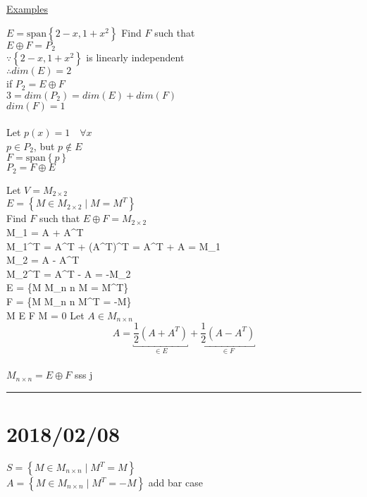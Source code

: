 \documentclass[12pt]{article}
\newcommand{\uu}[1]{\underbracket{#1}}
\newcommand{\todo}[0]{\text{\textcolor{red}{\textbackslash\textbackslash TODO \ }}}
\newenvironment{examples}{\shownto{-,compact}\underline{Examples}\enumerate}{\endenumerate\divider\endshownto}
\newcommand{\bb}[1]{\left\{#1\right\}}
\newcommand{\pp}[1]{\left(#1\right)}
\newcommand{\divider}[0]{\par\textcolor{lightgray}{\rule{\textwidth}{0.1pt}}}
\newcommand{\sspan}[1]{\text{span}\bb{#1}}
\newenvironment{eqn}{\equation\alignedat{3}}{\endalignedat\endequation}
\begin{document}
\begin{examples}
	\item $E = \sspan{2 - x, 1 + x^2}$ \qquad Find $F$ such that \\
	$E \oplus F = P_2$ \\
	$\because \bb{2 - x, 1 + x^2}$ is linearly independent \\
	$\therefore dim(E) = 2$ \\
	if $P_2 = E \oplus F$ \\ 
	$3 = dim(P_2) = dim(E) + dim(F)$ \\
	$dim(F) = 1$ \\\\
	Let $p(x) = 1 \quad \forall x$ \\
	$p \in P_2$, but $p \notin E$ \\
	$F = \sspan{p}$ \\
	$P_2 = F \oplus E$
	
	\item Let $V = M_{2 \times 2}$ \\
	$E = \bb{M \in M_{2 \times 2} \mid M = M^T}$ \\
	Find $F$ such that $E \oplus F = M_{2 \times 2}$ \\
	
	\begin{eqn}
		M_1 = A + A^T \\
		M_1^T = A^T + \pp{A^T}^T = A^T + A = M_1 \\
		M_2 = A - A^T \\
		M_2^T = A^T - A = -M_2 \\
		E = \bb{M \in M_{n \times n} \mid M = M^T} \\
		F = \bb{M \in M_{n \times n} \mid M^T = -M} \\
		M \in E \cap F \Rightarrow M = 0 
	\end{eqn}
	Let $A \in M_{n \times n}$ \\
	$$A = \uu{\frac{1}{2} (A + A^T)}_{\in E} + \uu{\frac{1}{2} (A - A^T)}_{\in F}$$ \\
	$M_{n \times n} = E \oplus F$
sss	j
\end{examples}


\section{2018/02/08}

$S = \bb{M \in M_{n \times n} \mid M^T = M}$ \\
$A = \bb{M \in M_{n \times n} \mid M^T = -M}$
\todo add bar case
\end{document}
